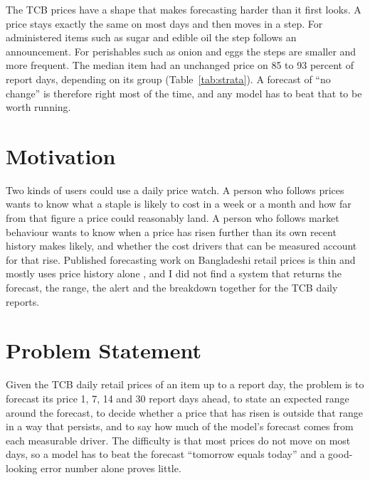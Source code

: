 \documentclass[12pt]{report}
\begin{document}
The TCB prices have a shape that makes forecasting harder than it first looks. A price stays exactly the same on most days and then moves in a step. For administered items such as sugar and edible oil the step follows an announcement. For perishables such as onion and eggs the steps are smaller and more frequent. The median item had an unchanged price on 85 to 93 percent of report days, depending on its group (Table~\ref{tab:strata}). A forecast of ``no change'' is therefore right most of the time, and any model has to beat that to be worth running.

\section{Motivation}
Two kinds of users could use a daily price watch. A person who follows prices wants to know what a staple is likely to cost in a week or a month and how far from that figure a price could reasonably land. A person who follows market behaviour wants to know when a price has risen further than its own recent history makes likely, and whether the cost drivers that can be measured account for that rise. Published forecasting work on Bangladeshi retail prices is thin and mostly uses price history alone \cite{agripricebd}, and I did not find a system that returns the forecast, the range, the alert and the breakdown together for the TCB daily reports.

\section{Problem Statement}
Given the TCB daily retail prices of an item up to a report day, the problem is to forecast its price 1, 7, 14 and 30 report days ahead, to state an expected range around the forecast, to decide whether a price that has risen is outside that range in a way that persists, and to say how much of the model's forecast comes from each measurable driver. The difficulty is that most prices do not move on most days, so a model has to beat the forecast ``tomorrow equals today'' and a good-looking error number alone proves little.
\end{document}
